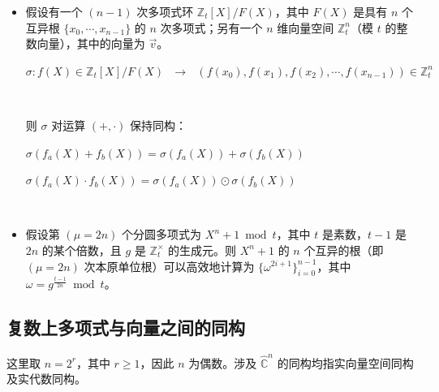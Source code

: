 \begin{tcolorbox}[title={\textbf{\tboxtheorem{\ref*{subsubsec:poly-vector-transformation-modulus}} 整数（环）上多项式与向量之间的同构}}]

\begin{itemize}
\item 假设有一个 $(n-1)$ 次多项式环 $\mathbb{Z}_t[X] / F(X)$，其中 $F(X)$ 是具有 $n$ 个互异根 $\{x_0, \cdots, x_{n-1}\}$ 的 $n$ 次多项式；另有一个 $n$ 维向量空间 $\mathbb{Z}_t^n$（模 $t$ 的整数向量），其中的向量为 $\vec{v}$。

$\sigma: f(X) \in \mathbb{Z}_t[X] / F(X) \text{ } \longrightarrow \text{ } (f(x_0), f(x_1), f(x_2), \cdots, f(x_{n-1})) \in \mathbb{Z}_t^n$

$ $

则 $\sigma$ 对运算 $(+, \cdot)$ 保持同构：


$\sigma(f_a(X) + f_b(X)) = \sigma(f_a(X)) + \sigma(f_b(X))$

$\sigma(f_a(X) \cdot f_b(X)) = \sigma(f_a(X)) \odot \sigma(f_b(X))$

$ $




\item 假设第 $(\mu=2n)$ 个分圆多项式为 $X^n + 1 \bmod t$，其中 $t$ 是素数，$t - 1$ 是 $2n$ 的某个倍数，且 $g$ 是 $\mathbb{Z}_t^{\times}$ 的生成元。则 $X^n + 1$ 的 $n$ 个互异的根（即 $(\mu=2n)$ 次本原单位根）可以高效地计算为 $\{\omega^{2i + 1}\}_{i=0}^{n-1}$，其中 $\omega = g^{\frac{t-1}{2n}} \bmod t$。


\end{itemize}
\end{tcolorbox}





\subsection{复数上多项式与向量之间的同构}
\label{subsec:poly-vector-transformation-complex}

这里取 $n=2^r$，其中 $r\ge1$，因此 $n$ 为偶数。涉及 $\hat{\mathbb C}^n$ 的同构均指实向量空间同构及实代数同构。


